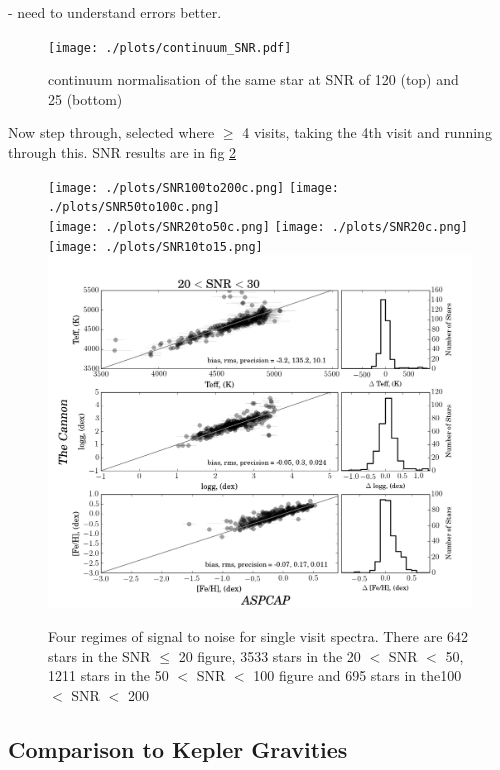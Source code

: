 \documentclass[12pt, preprint]{aastex}
\begin{document}
 - need to understand errors better. 
 
 
\begin{figure}[h!]
  \texttt{[image: ./plots/continuum\_SNR.pdf]}
\caption{continuum normalisation of the same star at SNR of 120 (top) and 25 (bottom) }
\label{fig:lowsnr}
\end{figure}

Now step through, selected where $\ge$ 4 visits, taking the 4th visit and running through this. SNR results are in fig \ref{fig:SNR}

 \begin{figure}[h!]
 \texttt{[image: ./plots/SNR100to200c.png]}
\texttt{[image: ./plots/SNR50to100c.png]}\\
\texttt{[image: ./plots/SNR20to50c.png]}
\texttt{[image: ./plots/SNR20c.png]}\\
\texttt{[image: ./plots/SNR10to15.png]}
\includegraphics[scale=0.24]{./plots/SNR20to30.png}
  \caption{Four regimes of signal to noise for single visit spectra. There are 642 stars in the SNR $\le$ 20 figure, 3533 stars in the 20 $<$ SNR $<$ 50, 1211 stars in the 50 $<$ SNR $<$ 100 figure and 695 stars in the100 $<$  SNR $<$ 200}
\label{fig:SNR}
\end{figure}


\subsection{Comparison to Kepler Gravities}
\end{document}
